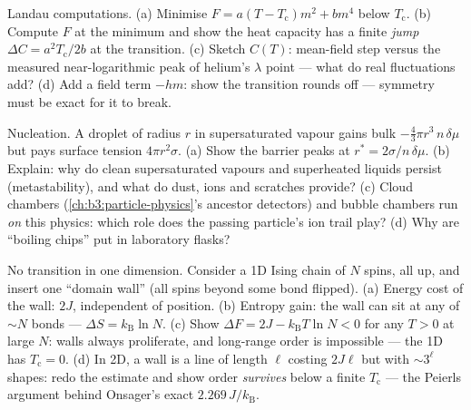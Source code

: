 \begin{exercise}[$\star\star$]\label{exo:b3:phase-transitions:8}
Landau computations. (a) Minimise $F = a(T - T_{\text{c}})m^2 +
bm^4$ below $T_{\text{c}}$. (b) Compute $F$ at the minimum and
show the heat capacity has a finite \emph{jump} $\Delta C =
a^2T_{\text{c}}/2b$ at the transition. (c) Sketch $C(T)$:
mean-field step versus the measured near-logarithmic peak of
helium's $\lambda$ point --- what do real fluctuations add? (d)
Add a field term $-hm$: show the transition rounds off ---
symmetry must be exact for it to break.
\end{exercise}

\begin{exercise}[$\star\star$]\label{exo:b3:phase-transitions:9}
Nucleation. A droplet of radius $r$ in supersaturated vapour
gains bulk  $-\tfrac43\pi r^3\,n\,\delta\mu$ but pays
surface tension $4\pi r^2\sigma$. (a) Show the barrier peaks at
$r^* = 2\sigma/n\,\delta\mu$. (b) Explain: why do clean
supersaturated vapours and superheated liquids persist
(metastability), and what do dust, ions and scratches provide?
(c) Cloud chambers (\cref{ch:b3:particle-physics}'s ancestor
detectors) and bubble chambers run \emph{on} this physics: which
role does the passing particle's ion trail play? (d) Why are
``boiling chips'' put in laboratory flasks?
\end{exercise}

\begin{exercise}[$\star\star\star$]\label{exo:b3:phase-transitions:10}
No transition in one dimension. Consider a 1D Ising chain of $N$
spins, all up, and insert one ``domain wall'' (all spins beyond
some bond flipped). (a) Energy cost of the wall: $2J$,
independent of position. (b) Entropy gain: the wall can sit at
any of $\sim N$ bonds --- $\Delta S = k_{\text{B}}\ln N$. (c)
Show $\Delta F = 2J - k_{\text{B}}T\ln N < 0$ for any $T > 0$ at
large $N$: walls always proliferate, and long-range order is
impossible --- the 1D  has $T_{\text{c}} = 0$. (d) In
2D, a wall is a line of length $\ell$ costing $2J\ell$ but with
$\sim3^\ell$ shapes: redo the estimate and show order
\emph{survives} below a finite $T_{\text{c}}$ --- the
Peierls argument behind Onsager's exact $2.269\,J/k_{\text{B}}$.
\end{exercise}


